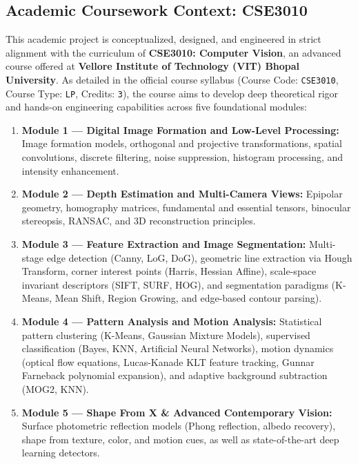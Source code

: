 \subsection{Academic Coursework Context: CSE3010}
This academic project is conceptualized, designed, and engineered in strict alignment with the curriculum of \textbf{CSE3010: Computer Vision}, an advanced course offered at \textbf{Vellore Institute of Technology (VIT) Bhopal University}. As detailed in the official course syllabus (Course Code: \texttt{CSE3010}, Course Type: \texttt{LP}, Credits: \texttt{3}), the course aims to develop deep theoretical rigor and hands-on engineering capabilities across five foundational modules:
\begin{enumerate}
    \item \textbf{Module 1 — Digital Image Formation and Low-Level Processing:} Image formation models, orthogonal and projective transformations, spatial convolutions, discrete filtering, noise suppression, histogram processing, and intensity enhancement.
    \item \textbf{Module 2 — Depth Estimation and Multi-Camera Views:} Epipolar geometry, homography matrices, fundamental and essential tensors, binocular stereopsis, RANSAC, and 3D reconstruction principles.
    \item \textbf{Module 3 — Feature Extraction and Image Segmentation:} Multi-stage edge detection (Canny, LoG, DoG), geometric line extraction via Hough Transform, corner interest points (Harris, Hessian Affine), scale-space invariant descriptors (SIFT, SURF, HOG), and segmentation paradigms (K-Means, Mean Shift, Region Growing, and edge-based contour parsing).
    \item \textbf{Module 4 — Pattern Analysis and Motion Analysis:} Statistical pattern clustering (K-Means, Gaussian Mixture Models), supervised classification (Bayes, KNN, Artificial Neural Networks), motion dynamics (optical flow equations, Lucas-Kanade KLT feature tracking, Gunnar Farneback polynomial expansion), and adaptive background subtraction (MOG2, KNN).
    \item \textbf{Module 5 — Shape From X \& Advanced Contemporary Vision:} Surface photometric reflection models (Phong reflection, albedo recovery), shape from texture, color, and motion cues, as well as state-of-the-art deep learning detectors.
\end{enumerate}

